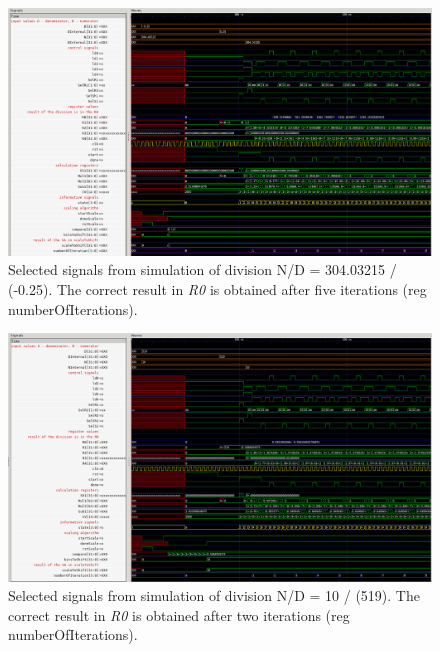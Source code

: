 \documentclass[a4paper, twoside, 11pt]{article}
\begin{document}
\begin{figure}[htbp!]
  \centering
  \includegraphics[width=1\textwidth]{src/png/division-304-03215-div-min-0-25.png}
    \caption{Selected signals from simulation of division N/D = 304.03215 / (-0.25). The correct result in \textit{R0} is obtained after five iterations (reg numberOfIterations).}
  \label{fig:division-304-03215-div-min-0-25}
\end{figure}

\begin{figure}[htbp!]
  \centering
  \includegraphics[width=1\textwidth]{src/png/division-10-div-519.png}
    \caption{Selected signals from simulation of division N/D = 10 / (519). The correct result in \textit{R0} is obtained after two iterations (reg numberOfIterations).}
  \label{fig:division-10-div-519}
\end{figure}
\end{document}
